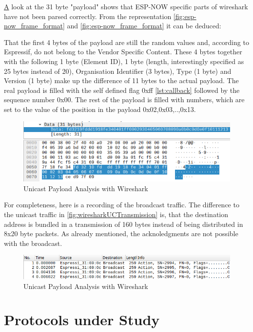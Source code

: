 \href{lst:callback}
A look at the 31 byte "payload" shows that ESP-NOW specific parts of wireshark have not been parsed correctly.
From the representation \cref{fig:esp-now_frame_format} and \cref{fig:esp-now_frame_format} it can be deduced:

That the first 4 bytes of the payload are still the random values and, according to Espressif, 
do not belong to the Vendor Specific Content.
These 4 bytes together with the following 1 byte (Element ID), 1 byte (length, interestingly specified as 25 bytes instead of 20),
Organisation Identifier (3 bytes), Type (1 byte) and Version (1 byte) make up the difference of 11 bytes to the actual payload.
The real payload is filled with the self defined flag 0xff \cref{lst:callback} followed by the sequence number 0x00.
The rest of the payload is filled with numbers, which are set to the value of the position in the payload 0x02,0x03,..,0x13.

\begin{figure}[h]
	\centering
	\includegraphics[scale=0.4]{figures/wiresharkPayload.png}
	\caption{Unicast Payload Analysis with Wireshark}
	\label{fig:wiresharkPayload}
\end{figure}

For completeness, here is a recording of the broadcast traffic.
The difference to the unicast traffic in \cref{fig:wiresharkUCTransmission} is,
that the destination address is bundled in a transmission of 160 bytes instead of being distributed in 8x20 byte packets.
As already mentioned, the acknoledgments are not possible with the broadcast.

\begin{figure}[h]
	\centering
	\includegraphics[scale=0.5]{figures/wiresharkBC.png}
	\caption{Unicast Payload Analysis with Wireshark}
	\label{fig:wiresharkBCTransmission}
\end{figure}

\section{Protocols under Study}

